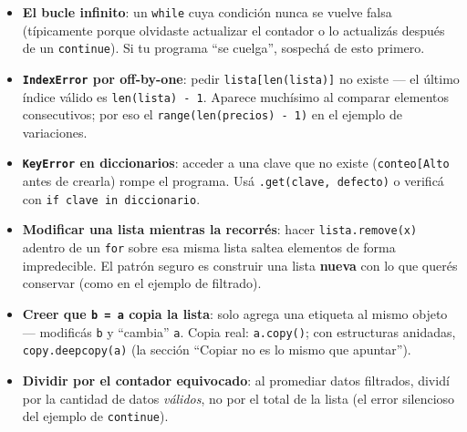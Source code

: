 \documentclass[
  spanish,
  letterpaper,
  DIV=11,
  numbers=noendperiod]{scrreprt}
\providecommand{\tightlist}{%
  \setlength{\itemsep}{0pt}\setlength{\parskip}{0pt}}
\begin{document}
\begin{tcolorbox}[enhanced jigsaw, bottomrule=.15mm, colback=white, opacitybacktitle=0.6, arc=.35mm, toprule=.15mm, opacityback=0, breakable, titlerule=0mm, left=2mm, coltitle=black, colbacktitle=quarto-callout-warning-color!10!white, colframe=quarto-callout-warning-color-frame, leftrule=.75mm, toptitle=1mm, bottomtitle=1mm, title=\textcolor{quarto-callout-warning-color}{\faExclamationTriangle}\hspace{0.5em}{Trampas frecuentes}, rightrule=.15mm]

\begin{itemize}
\tightlist
\item
  \textbf{El bucle infinito}: un \texttt{while} cuya condición nunca se
  vuelve falsa (típicamente porque olvidaste actualizar el contador o lo
  actualizás después de un \texttt{continue}). Si tu programa ``se
  cuelga'', sospechá de esto primero.
\item
  \textbf{\texttt{IndexError} por off-by-one}: pedir
  \texttt{lista{[}len(lista){]}} no existe --- el último índice válido
  es \texttt{len(lista)\ -\ 1}. Aparece muchísimo al comparar elementos
  consecutivos; por eso el \texttt{range(len(precios)\ -\ 1)} en el
  ejemplo de variaciones.
\item
  \textbf{\texttt{KeyError} en diccionarios}: acceder a una clave que no
  existe (\texttt{conteo{[}\textquotesingle{}Alto\textquotesingle{}{]}}
  antes de crearla) rompe el programa. Usá
  \texttt{.get(clave,\ defecto)} o verificá con
  \texttt{if\ clave\ in\ diccionario}.
\item
  \textbf{Modificar una lista mientras la recorrés}: hacer
  \texttt{lista.remove(x)} adentro de un \texttt{for} sobre esa misma
  lista saltea elementos de forma impredecible. El patrón seguro es
  construir una lista \textbf{nueva} con lo que querés conservar (como
  en el ejemplo de filtrado).
\item
  \textbf{Creer que \texttt{b\ =\ a} copia la lista}: solo agrega una
  etiqueta al mismo objeto --- modificás \texttt{b} y ``cambia''
  \texttt{a}. Copia real: \texttt{a.copy()}; con estructuras anidadas,
  \texttt{copy.deepcopy(a)} (la sección ``Copiar no es lo mismo que
  apuntar'').
\item
  \textbf{Dividir por el contador equivocado}: al promediar datos
  filtrados, dividí por la cantidad de datos \emph{válidos}, no por el
  total de la lista (el error silencioso del ejemplo de
  \texttt{continue}).
\end{itemize}

\end{tcolorbox}
\end{document}
